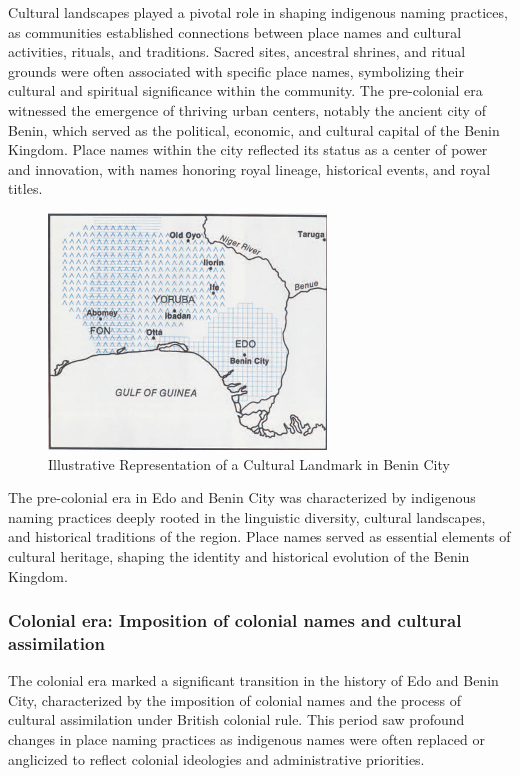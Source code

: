 Cultural landscapes played a pivotal role in shaping indigenous naming practices, as communities established connections between place names and cultural activities, rituals, and traditions. Sacred sites, ancestral shrines, and ritual grounds were often associated with specific place names, symbolizing their cultural and spiritual significance within the community.
The pre-colonial era witnessed the emergence of thriving urban centers, notably the ancient city of Benin, which served as the political, economic, and cultural capital of the Benin Kingdom. Place names within the city reflected its status as a center of power and innovation, with names honoring royal lineage, historical events, and royal titles\cite{egharevba1968short}.

\begin{figure}[h!]
    \centering
    \includegraphics[width=0.8\linewidth]{imauuge.png}
    \caption{Illustrative Representation of a Cultural Landmark in Benin City}
    \label{fig:cultural_landmark_benin}
\end{figure}

The pre-colonial era in Edo and Benin City was characterized by indigenous naming practices deeply rooted in the linguistic diversity, cultural landscapes, and historical traditions of the region. Place names served as essential elements of cultural heritage, shaping the identity and historical evolution of the Benin Kingdom.
\subsubsection{Colonial era: Imposition of colonial names and cultural assimilation}
The colonial era marked a significant transition in the history of Edo and Benin City, characterized by the imposition of colonial names and the process of cultural assimilation under British colonial rule. This period saw profound changes in place naming practices as indigenous names were often replaced or anglicized to reflect colonial ideologies and administrative priorities.


